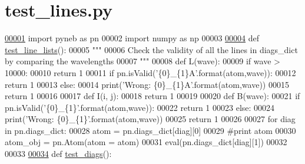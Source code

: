 \hypertarget{test__lines_8py_source}{}\section{test\+\_\+lines.\+py}
\label{test__lines_8py_source}

\begin{DoxyCode}
\hypertarget{test__lines_8py_source_l00001}{}\hyperlink{namespacepyneb_1_1test_1_1test__lines}{00001} \textcolor{keyword}{import} pyneb \textcolor{keyword}{as} pn
00002 \textcolor{keyword}{import} numpy \textcolor{keyword}{as} np
00003 
\hypertarget{test__lines_8py_source_l00004}{}\hyperlink{namespacepyneb_1_1test_1_1test__lines_af8bbc40c02e8cac6dcd70407e6382974}{00004} \textcolor{keyword}{def }\hyperlink{namespacepyneb_1_1test_1_1test__lines_af8bbc40c02e8cac6dcd70407e6382974}{test\_line\_lists}():
00005     \textcolor{stringliteral}{"""}
00006 \textcolor{stringliteral}{    Check the validity of all the lines in diags\_dict by comparing the wavelengths}
00007 \textcolor{stringliteral}{    """}
00008     \textcolor{keyword}{def }L(wave):
00009         \textcolor{keywordflow}{if} wave > 10000:
00010             \textcolor{keywordflow}{return} 1
00011         \textcolor{keywordflow}{if} pn.isValid(\textcolor{stringliteral}{'\{0\}\_\{1\}A'}.format(atom,wave)):
00012             \textcolor{keywordflow}{return} 1
00013         \textcolor{keywordflow}{else}:
00014             print(\textcolor{stringliteral}{'Wrong: \{0\}\_\{1\}A'}.format(atom,wave))
00015             \textcolor{keywordflow}{return} 1
00016         
00017     \textcolor{keyword}{def }I(i, j):
00018         \textcolor{keywordflow}{return} 1
00019     
00020     \textcolor{keyword}{def }B(wave):
00021         \textcolor{keywordflow}{if} pn.isValid(\textcolor{stringliteral}{'\{0\}\_\{1\}'}.format(atom,wave)):
00022             \textcolor{keywordflow}{return} 1
00023         \textcolor{keywordflow}{else}:
00024             print(\textcolor{stringliteral}{'Wrong: \{0\}\_\{1\}'}.format(atom,wave))
00025             \textcolor{keywordflow}{return} 1
00026     
00027     \textcolor{keywordflow}{for} diag \textcolor{keywordflow}{in} pn.diags\_dict:
00028         atom = pn.diags\_dict[diag][0]
00029         \textcolor{comment}{#print atom}
00030         atom\_obj = pn.Atom(atom = atom)
00031         eval(pn.diags\_dict[diag][1])
00032 
00033 
\hypertarget{test__lines_8py_source_l00034}{}\hyperlink{namespacepyneb_1_1test_1_1test__lines_a0717401ecf42fd5215ae1c8b8f3cf413}{00034} \textcolor{keyword}{def }\hyperlink{namespacepyneb_1_1test_1_1test__lines_a0717401ecf42fd5215ae1c8b8f3cf413}{test\_diags}():

\end{DoxyCode}
